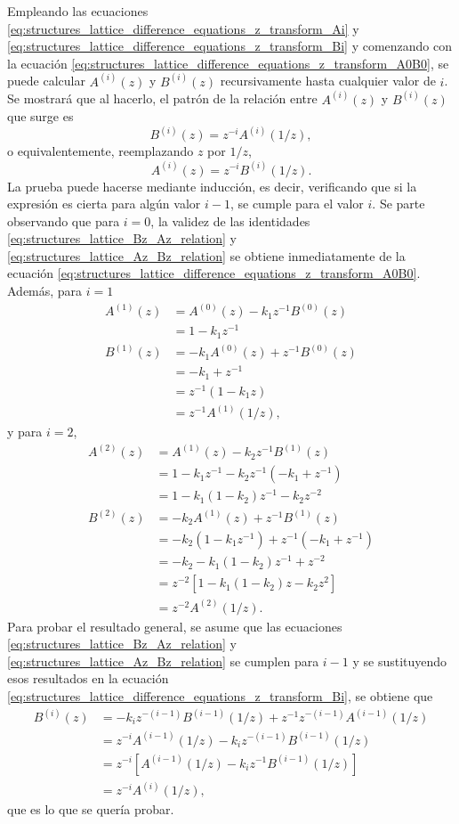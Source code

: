 \documentclass[a4paper]{report}
\begin{document}
Empleando las ecuaciones \ref{eq:structures_lattice_difference_equations_z_transform_Ai} y \ref{eq:structures_lattice_difference_equations_z_transform_Bi} y comenzando con la ecuación \ref{eq:structures_lattice_difference_equations_z_transform_A0B0}, se puede calcular \(A^{(i)}(z)\) y \(B^{(i)}(z)\)  recursivamente hasta cualquier valor de \(i\). Se mostrará que al hacerlo, el patrón de la relación entre \(A^{(i)}(z)\) y \(B^{(i)}(z)\) que surge es
\begin{equation}\label{eq:structures_lattice_Bz_Az_relation}
 B^{(i)}(z)=z^{-i}A^{(i)}(1/z),
\end{equation}
o equivalentemente, reemplazando \(z\) por \(1/z\),
\begin{equation}\label{eq:structures_lattice_Az_Bz_relation}
 A^{(i)}(z)=z^{-i}B^{(i)}(1/z).
\end{equation}
La prueba puede hacerse mediante inducción, es decir, verificando que si la expresión es cierta para algún valor \(i-1\), se cumple para el valor \(i\). Se parte observando que para \(i=0\), la validez de las identidades \ref{eq:structures_lattice_Bz_Az_relation} y \ref{eq:structures_lattice_Az_Bz_relation} se obtiene inmediatamente de la ecuación \ref{eq:structures_lattice_difference_equations_z_transform_A0B0}. Además, para \(i=1\)
\begin{align*}
 A^{(1)}(z)&=A^{(0)}(z)-k_1z^{-1}B^{(0)}(z)\\
   &=1-k_1z^{-1}\\
 B^{(1)}(z)&=-k_1A^{(0)}(z)+z^{-1}B^{(0)}(z)\\
   &=-k_1+z^{-1}\\
   &=z^{-1}(1-k_1z)\\
   &=z^{-1}A^{(1)}(1/z),
\end{align*}
y para \(i=2\),
\begin{align*}
 A^{(2)}(z)&=A^{(1)}(z)-k_2z^{-1}B^{(1)}(z)\\
   &=1-k_1z^{-1}-k_2z^{-1}(-k_1+z^{-1})\\
   &=1-k_1(1-k_2)z^{-1}-k_2z^{-2}\\
 B^{(2)}(z)&=-k_2A^{(1)}(z)+z^{-1}B^{(1)}(z)\\
   &=-k_2(1-k_1z^{-1})+z^{-1}(-k_1+z^{-1})\\
   &=-k_2-k_1(1-k_2)z^{-1}+z^{-2}\\
   &=z^{-2}[1-k_1(1-k_2)z-k_2z^{2}]\\
   &=z^{-2}A^{(2)}(1/z).
\end{align*}
Para probar el resultado general, se asume que las ecuaciones \ref{eq:structures_lattice_Bz_Az_relation} y \ref{eq:structures_lattice_Az_Bz_relation} se cumplen para \(i-1\) y se sustituyendo esos resultados en la ecuación \ref{eq:structures_lattice_difference_equations_z_transform_Bi}, se obtiene que
\begin{align*}
 B^{(i)}(z)&=-k_iz^{-(i-1)}B^{(i-1)}(1/z)+z^{-1}z^{-(i-1)}A^{(i-1)}(1/z)\\
  &=z^{-i}A^{(i-1)}(1/z)-k_iz^{-(i-1)}B^{(i-1)}(1/z)\\
  &=z^{-i}[A^{(i-1)}(1/z)-k_iz^{-1}B^{(i-1)}(1/z)]\\
  &=z^{-i}A^{(i)}(1/z),
\end{align*}
que es lo que se quería probar.
\end{document}
